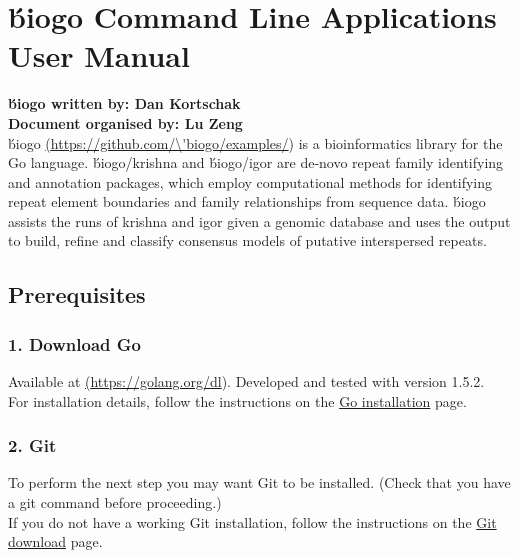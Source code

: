 \documentclass[12pt]{report}
\begin{document}
 \sloppy

\author{Author Name}
\date{Day Month Year}


\section*{\'biogo Command Line Applications User Manual}
\textbf{\'biogo written by: Dan Kortschak} \\
\textbf{Document organised by: Lu Zeng} \\

\'biogo \href{<url>}(\url{https://github.com/\'biogo/examples/}) is a bioinformatics library for the Go language. \'biogo/krishna and \'biogo/igor are de-novo repeat family identifying and annotation packages, which employ computational methods for identifying repeat element boundaries and family relationships from sequence data. \'biogo assists the runs of krishna and igor given a genomic database and uses the output to build, refine and classify consensus models of putative interspersed repeats. 


\subsection*{{Prerequisites}}

\subsubsection{1. Download Go }
Available at \href{<url>} (\url{https://golang.org/dl}). Developed and tested with version 1.5.2. \\
For installation details, follow the instructions on the \href{https://golang.org/doc/install#install} {\color{blue}Go installation} page.


\subsubsection{2. Git}
To perform the next step you may want Git to be installed. (Check that you have a git command before proceeding.) \\

If you do not have a working Git installation, follow the instructions on the \href{https://git-scm.com/downloads}{\color{blue}Git download} page.
\end{document}
